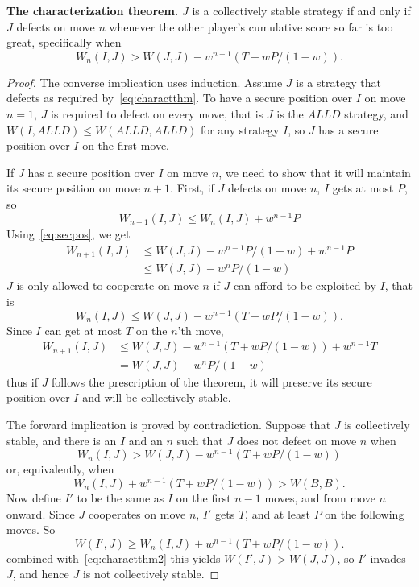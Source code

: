 \begin{theorem}\textbf{The characterization theorem.} \label{thm:charactthm}
$J$ is a collectively stable strategy if and only if $J$ defects on move $n$ whenever the other player's cumulative score so far is too great, specifically when
\begin{equation}\label{eq:charactthm}
W_n(I,J) > W(J, J) - w^{n-1}(T + wP/(1-w)).
\end{equation}
\end{theorem}
\begin{proof}
The converse implication uses induction. Assume $J$ is a strategy that defects as required by~\ref{eq:charactthm}. To have a secure position over $I$ on move $n=1$, $J$ is required to defect on every move, that is $J$ is the $ALLD$ strategy, and $W(I, ALLD) \leq W(ALLD, ALLD)$ for any strategy $I$, so $J$ has a secure position over $I$ on the first move.

If $J$ has a secure position over $I$ on move $n$, we need to show that it will maintain its secure position on move $n+1$. First, if $J$ defects on move $n$, $I$ gets at most $P$, so
\[
W_{n+1}(I, J) \leq W_n(I, J) + w^{n-1}P
\]
Using~\ref{eq:secpos}, we get
\begin{align*}
W_{n+1}(I, J) 
&\leq W(J, J) - w^{n-1}P/(1-w) + w^{n-1}P \\
&\leq W(J, J) - w^{n}P/(1-w)
\end{align*}
$J$ is only allowed to cooperate on move $n$ if $J$ can afford to be exploited by $I$, that is
\[
W_n (I, J) \leq W(J, J) - w^{n-1}(T + wP/(1-w)).
\]
Since $I$ can get at most $T$ on the $n$'th move,
\begin{align*}
W_{n+1} (I, J)
&\leq W(J, J) - w^{n-1} (T + wP/(1-w)) + w^{n-1}T \\
&= W(J, J) - w^n P / (1-w)
\end{align*}
thus if $J$ follows the prescription of the theorem, it will preserve its secure position over $I$ and will be collectively stable.

The forward implication is proved by contradiction. Suppose that $J$ is collectively stable, and there is an $I$ and an $n$ such that $J$ does not defect on move $n$ when
\[
W_n (I, J) > W(J, J) - w^{n-1}(T + wP / (1-w))
\]
or, equivalently, when
\begin{equation}\label{eq:charactthm2}
W_n (I, J) + w^{n-1}(T + wP / (1-w)) > W(B, B).
\end{equation}
Now define $I'$ to be the same as $I$ on the first $n-1$ moves, and from move $n$ onward. Since $J$ cooperates on move $n$, $I'$ gets $T$, and at least $P$ on the following moves. So
\[
W(I', J) \geq W_n (I, J) + w^{n-1}(T + wP/(1-w)).
\]
combined with~\ref{eq:charactthm2} this yields $W(I', J) > W(J, J)$, so $I'$ invades $J$, and hence $J$ is not collectively stable.
\end{proof}


